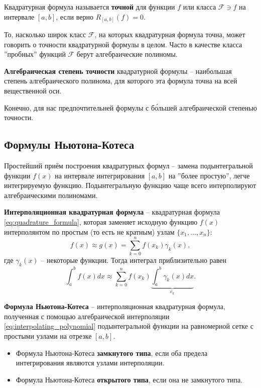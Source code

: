 \documentclass[../main.tex]{subfile}
\begin{document}
\begin{define}
	Квадратурная формула называется \textbf{точной} для функции $f$ или
	класса $\mathcal F\ni f$ на интервале $[a,b]$, если верно $R_{[a,b]}(f)=0$.
\end{define}

То, насколько широк класс $\mathcal F$, на которых квадратурная формула точна,
может говорить о точности квадратурной формулы в целом. Часто в качестве класса
''пробных'' функций $\mathcal F$ берут алгебраические полиномы.

\begin{define}
	\textbf{Алгебраическая степень точности} квадратурной формулы --
	наибольшая степень алгебраического полинома, для которого эта формула
	точна на всей вещественной оси.
\end{define}

Конечно, для нас предпочтительней формулы с б\'{о}льшей алгебраической степенью
точности.

\subsection{Формулы Ньютона-Котеса}
Простейший приём построения квадратурных формул -- замена подынтегральной
функции $f(x)$ на интервале интегрирования $[a,b]$ на ''более простую'',
легче интегрируемую функцию. Подынтегральную функцию чаще всего интерполируют
алгебраическими полиномами.\newpage

\begin{define}
	\textbf{Интерполяционная квадратурная формула} -- квадратурная формула
	\eqref{eq:quadrature_formula}, которая заменяет исходную функцию $f(x)$
	интерполянтом по простым (то есть не кратным) узлам $\{x_1,...,x_n\}$:
	\[f(x)\approx g(x)=\sum_{k=0}^{n}f(x_k)\gamma_k(x),\]
	где $\gamma_k(x)$ -- некоторые функции. Тогда интеграл приблизительно
	равен
	\[\int_{a}^{b}f(x)dx\approx\sum_{k=0}^{n}f(x_k)
	\underset{c_k}{\underbrace{\int_{a}^{b}\gamma_k(x)dx}}.\]
\end{define}

\begin{define}\label{eq:newton_cotes_formula}
	\textbf{Формула Ньютона-Котеса} -- интерполяционная квадратурная
	формула, полученная с помощью алгебраической интерполяции
	\eqref{eq:interpolating_polynomial} подынтегральной функции на
	равномерной сетке с простыми узлами на отрезке $[a,b]$.
\end{define}

\begin{define}
	\begin{itemize}[nosep, before = \leavevmode\vspace{-\baselineskip}]
		\item Формула Ньютона-Котеса \textbf{замкнутого типа},
			если оба предела интегрирования являются узлами
			интерполяции.
		\item Формула Ньютона-Котеса \textbf{открытого типа},
			если она не замкнутого типа.
	\end{itemize}
\end{define}
\end{document}
